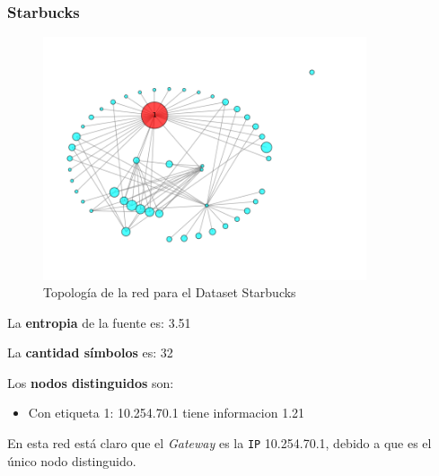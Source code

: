 \subsubsection{Starbucks}

\begin{figure}[H]
    \centering
    \includegraphics[width=0.85\textwidth]{imagenes/starbucks.png}
    \caption{Topología de la red para el Dataset Starbucks}
\end{figure}

La \textbf{entropia} de la fuente es: 3.51

La \textbf{cantidad símbolos} es: 32

Los \textbf{nodos distinguidos} son:

\begin{itemize}
    \item Con etiqueta 1: 10.254.70.1 tiene informacion 1.21
\end{itemize}

En esta red está claro que el \textit{Gateway} es la \texttt{IP} 10.254.70.1, debido a que
es el único nodo distinguido.
